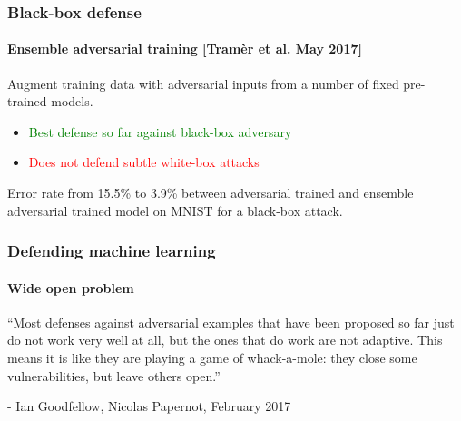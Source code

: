 \documentclass[9pt]{beamer}
\begin{document}
\begin{frame}
  \frametitle{Black-box defense}

  \framesubtitle{Ensemble adversarial training [Tramèr et al. May 2017]}

  Augment training data with adversarial inputs from a number of fixed
  pre-trained models.

  \medskip

  \begin{itemize}
  \item \textcolor{green}{Best defense so far against black-box
    adversary}
  \item \textcolor{red}{Does not defend subtle white-box attacks}
  \end{itemize}

  \medskip

  Error rate from 15.5\% to 3.9\% between adversarial trained and
  ensemble adversarial trained model on MNIST for a black-box attack.
\end{frame}

\begin{frame}

  \frametitle{Defending machine learning}

  \framesubtitle{Wide open problem}

  ``Most defenses against adversarial examples that have been proposed
  so far just do not work very well at all, but the ones that do work
  are not adaptive. This means it is like they are playing a game of
  whack-a-mole: they close some vulnerabilities, but leave others
  open.''

  \bigskip

  - Ian Goodfellow, Nicolas Papernot, February 2017
\end{frame}
\end{document}
